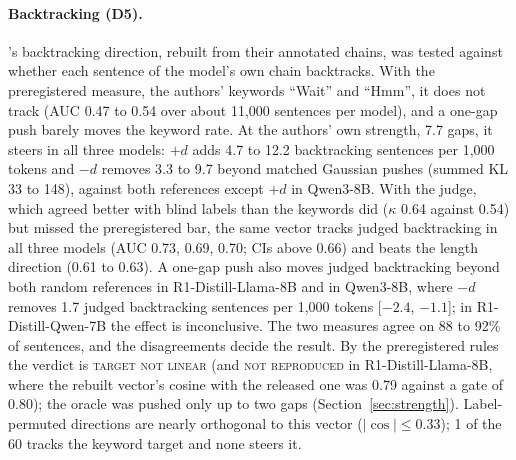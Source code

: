 \documentclass[11pt]{article}
\newcommand{\verdict}[1]{\textsc{\MakeLowercase{#1}}}
\begin{document}
\paragraph{Backtracking (D5).} \citet{ward2025backtracking}'s backtracking direction, rebuilt from their annotated chains, was tested against whether each sentence of the model's own chain backtracks. With the preregistered measure, the authors' keywords ``Wait'' and ``Hmm'', it does not track (AUC 0.47 to 0.54 over about 11,000 sentences per model), and a one-gap push barely moves the keyword rate. At the authors' own strength, 7.7 gaps, it steers in all three models: $+d$ adds 4.7 to 12.2 backtracking sentences per 1,000 tokens and $-d$ removes 3.3 to 9.7 beyond matched Gaussian pushes (summed KL 33 to 148), against both references except $+d$ in Qwen3-8B. With the judge, which agreed better with blind labels than the keywords did ($\kappa$ 0.64 against 0.54) but missed the preregistered bar, the same vector tracks judged backtracking in all three models (AUC 0.73, 0.69, 0.70; CIs above 0.66) and beats the length direction (0.61 to 0.63). A one-gap push also moves judged backtracking beyond both random references in R1-Distill-Llama-8B and in Qwen3-8B, where $-d$ removes 1.7 judged backtracking sentences per 1,000 tokens [$-2.4$, $-1.1$]; in R1-Distill-Qwen-7B the effect is inconclusive. The two measures agree on 88 to 92\% of sentences, and the disagreements decide the result. By the preregistered rules the verdict is \verdict{TARGET NOT LINEAR} (and \verdict{NOT REPRODUCED} in R1-Distill-Llama-8B, where the rebuilt vector's cosine with the released one was 0.79 against a gate of 0.80); the oracle was pushed only up to two gaps (Section~\ref{sec:strength}). Label-permuted directions are nearly orthogonal to this vector ($|\cos| \le 0.33$); 1 of the 60 tracks the keyword target and none steers it.
\end{document}
